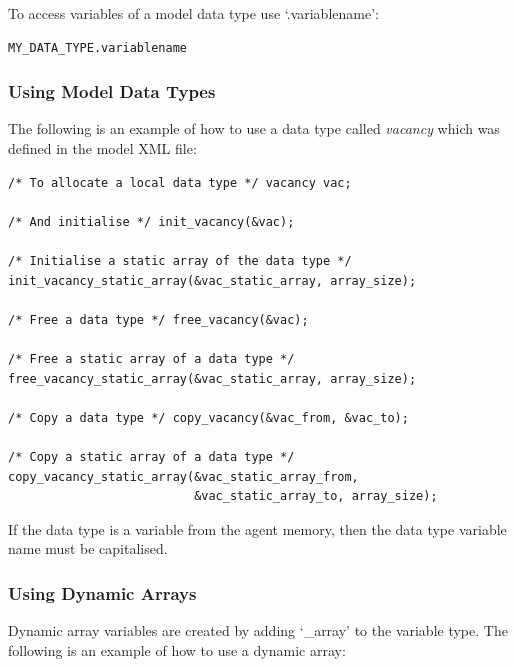 \documentclass[a4paper,11pt]{article}
\newenvironment{mylisting}
{\begin{list}{}{\setlength{\leftmargin}{1em}}\item\small\bfseries}
{\end{list}}
\begin{document}
To access variables of a model data type use `.variablename':

\begin{mylisting}
\begin{verbatim}
MY_DATA_TYPE.variablename
\end{verbatim}
\end{mylisting}

\subsubsection{Using Model Data Types}

The following is an example of how to use a data type called
\emph{vacancy} which was defined in the model XML file:

\begin{mylisting}
\begin{verbatim}
/* To allocate a local data type */ vacancy vac;

/* And initialise */ init_vacancy(&vac);

/* Initialise a static array of the data type */
init_vacancy_static_array(&vac_static_array, array_size);

/* Free a data type */ free_vacancy(&vac);

/* Free a static array of a data type */
free_vacancy_static_array(&vac_static_array, array_size);

/* Copy a data type */ copy_vacancy(&vac_from, &vac_to);

/* Copy a static array of a data type */
copy_vacancy_static_array(&vac_static_array_from,
                          &vac_static_array_to, array_size);
\end{verbatim}
\end{mylisting}

If the data type is a variable from the agent memory, then the data
type variable name must be capitalised.

\subsubsection{Using Dynamic Arrays}

Dynamic array variables are created by adding `\_array' to the
variable type. The following is an example of how to use a dynamic
array:
\end{document}
